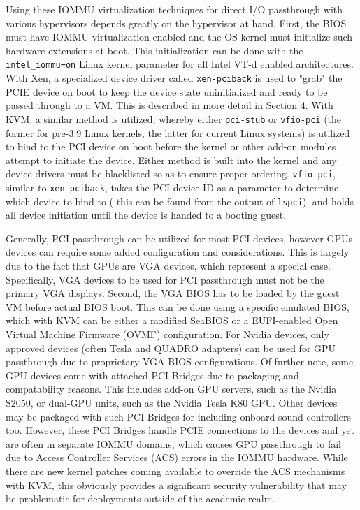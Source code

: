 Using these IOMMU virtualization techniques for direct I/O passthrough with various hypervisors depends greatly on the hypervisor at hand.  First, the BIOS must have IOMMU virtualization enabled and the OS kernel must initialize such hardware extensions at boot. This initialization can be done with the \verb|intel_iommu=on| Linux kernel parameter for all Intel VT-d enabled architectures.  With Xen, a specialized device driver called \verb|xen-pciback| is used to "grab" the PCIE device on boot to keep the device state uninitialized and ready to be passed through to a VM. This is described in more detail in Section 4. With KVM, a similar method is utilized, whereby either \verb|pci-stub| or \verb|vfio-pci| (the former for pre-3.9 Linux kernels, the latter for current Linux systems) is utilized to bind to the PCI device on boot before the kernel or other add-on modules attempt to initiate the device.  Either method is built into the kernel and any device drivers must be blacklisted so as to ensure proper ordering. \verb|vfio-pci|, similar to \verb|xen-pciback|, takes the PCI device ID as a parameter to determine which device to bind to ( this can be found from the output of \verb|lspci|), and holds all device initiation until the device is handed to a booting guest.  

Generally, PCI passthrough can be utilized for most PCI devices, however GPUs devices can require some added configuration and considerations.  This is largely due to the fact that GPUs are VGA devices, which represent a special case. Specifically, VGA devices to be used for PCI passthrough must not be the primary VGA displays. Second, the VGA BIOS has to be loaded by the guest VM before actual BIOS boot.  This can be done using a specific emulated BIOS, which with KVM can be either a modified SeaBIOS or a EUFI-enabled Open Virtual Machine Firmware (OVMF) configuration.  For Nvidia devices, only approved devices (often Tesla and QUADRO adapters) can be used for GPU passthrough due to proprietary VGA BIOS configurations. Of further note, some GPU devices come with attached PCI Bridges due to packaging and compatability reasons. This includes add-on GPU servers, such as the Nvidia S2050, or dual-GPU units, such as the Nvidia Tesla K80 GPU. Other devices may be packaged with such PCI Bridges for including onboard sound controllers too. However, these PCI Bridges handle PCIE connections to the devices and yet are often in separate IOMMU domains, which causes GPU passthrough to fail due to Access Controller Services (ACS) errors in the IOMMU hardware. While there are new kernel patches coming available to override the ACS mechanisms with KVM, this obviously provides a significant security vulnerability that may be problematic for deployments outside of the academic realm. 


